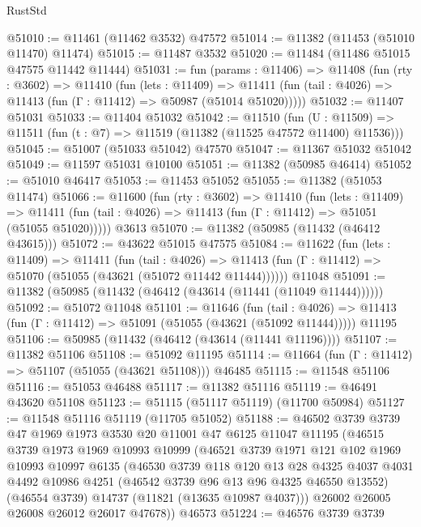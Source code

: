 \begin{lexlean}{RustStd}
\begin{coremodule}
@51010 := @11461 (@11462 @3532) @47572
@51014 := @11382 (@11453 (@51010 @11470) @11474)
@51015 := @11487 @3532
@51020 := @11484 (@11486 @51015 @47575 @11442 @11444)
@51031 := fun (params : @11406) =>
  @11408
    (fun (rty : @3602) =>
    @11410
      (fun (lets : @11409) =>
      @11411 (fun (tail : @4026) => @11413 (fun (Γ : @11412) => @50987 (@51014 @51020)))))
@51032 := @11407 @51031
@51033 := @11404 @51032
@51042 := @11510
    (fun (U : @11509) => @11511 (fun (t : @7) => @11519 (@11382 (@11525 @47572 @11400) @11536)))
@51045 := @51007 (@51033 @51042) @47570
@51047 := @11367 @51032 @51042
@51049 := @11597 @51031 @10100
@51051 := @11382 (@50985 @46414)
@51052 := @51010 @46417
@51053 := @11453 @51052
@51055 := @11382 (@51053 @11474)
@51066 := @11600
    (fun (rty : @3602) =>
    @11410
      (fun (lets : @11409) =>
      @11411 (fun (tail : @4026) => @11413 (fun (Γ : @11412) => @51051 (@51055 @51020)))))
    @3613
@51070 := @11382 (@50985 (@11432 (@46412 @43615)))
@51072 := @43622 @51015 @47575
@51084 := @11622
    (fun (lets : @11409) =>
    @11411
      (fun (tail : @4026) =>
      @11413 (fun (Γ : @11412) => @51070 (@51055 (@43621 (@51072 @11442 @11444))))))
    @11048
@51091 := @11382 (@50985 (@11432 (@46412 (@43614 (@11441 (@11049 @11444))))))
@51092 := @51072 @11048
@51101 := @11646
    (fun (tail : @4026) => @11413 (fun (Γ : @11412) => @51091 (@51055 (@43621 (@51092 @11444)))))
    @11195
@51106 := @50985 (@11432 (@46412 (@43614 (@11441 @11196))))
@51107 := @11382 @51106
@51108 := @51092 @11195
@51114 := @11664 (fun (Γ : @11412) => @51107 (@51055 (@43621 @51108))) @46485
@51115 := @11548 @51106
@51116 := @51053 @46488
@51117 := @11382 @51116
@51119 := @46491 @43620 @51108
@51123 := @51115 (@51117 @51119) (@11700 @50984)
@51127 := @11548 @51116 @51119 (@11705 @51052)
@51188 := @46502
    @3739
    @3739
    @47
    @1969
    @1973
    @3530
    @20
    @11001
    @47
    @6125
    @11047
    @11195
    (@46515
      @3739
      @1973
      @1969
      @10993
      @10999
      (@46521
        @3739
        @1971
        @121
        @102
        @1969
        @10993
        @10997
        @6135
        (@46530
          @3739
          @118
          @120
          @13
          @28
          @4325
          @4037
          @4031
          @4492
          @10986
          @4251
          (@46542 @3739 @96 @13 @96 @4325 @46550 @13552)
          (@46554 @3739)
          @14737
          (@11821 (@13635 @10987 @4037)))
        @26002
        @26005
        @26008
        @26012
        @26017
        @47678))
    @46573
@51224 := @46576
    @3739
    @3739

\end{coremodule}
\end{lexlean}
